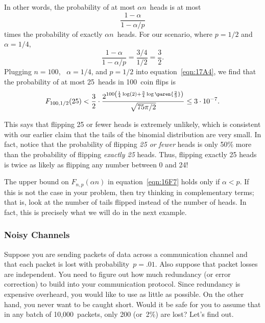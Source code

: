 \begin{editingnotes}
In other words, the probability of at most $\alpha n$~heads is at most
\begin{equation*}
    \frac{1 - \alpha}{1 - \alpha/p}
\end{equation*}
times the probability of exactly $\alpha n$~heads. For our scenario,
where $p = 1/2$ and $\alpha = 1/4$,
\begin{equation*}
\frac{1 - \alpha}{1 - \alpha/p}
    = \frac{3/4}{1/2} %
    = \frac{3}{2}.
\end{equation*}
Plugging $n = 100$, \ $\alpha = 1/4$, and $p = 1/2$ into
equation~\eqref{eqn:17A4}, we find that the probability of at most
25~heads in 100~coin flips is
\begin{equation*}
F_{100, 1/2}(25)
    < \frac{3}{2} \cdot
        \frac{  \displaystyle
                2^{100 \left( \frac{1}{4} \log(2)
                     + \frac{3}{4} \log\paren{\frac{2}{3}} \right) }
             }
             { \sqrt{75 \pi /2} } %
    \le 3 \cdot 10^{-7}.
\end{equation*}

This says that flipping 25 or fewer heads is extremely unlikely, which
is consistent with our earlier claim that the tails of the binomial
distribution are very small.  In fact, notice that the probability of
flipping \emph{25 or fewer} heads is only 50\% more than the
probability of flipping \emph{exactly 25} heads.  Thus, flipping
exactly 25 heads is twice as likely as flipping any number between 0
and 24!

\begin{caveat}
The upper bound on $F_{n, p}(\alpha n)$ in equation~\eqref{eqn:16F7}
holds only if $\alpha < p$.  If this is not the case in your problem,
then try thinking in complementary terms; that is, look at the number
of tails flipped instead of the number of heads.  In fact, this is
precisely what we will do in the next example.
\end{caveat}

\subsubsection{Noisy Channels}

Suppose you are sending packets of data across a communication channel
and that each packet is lost with probability~$p = .01$.  Also suppose
that packet losses are independent.  You need to figure out how much
redundancy (or error correction) to build into your communication
protocol.  Since redundancy is expensive overheard, you would like to
use as little as possible.  On the other hand, you never want to be
caught short.  Would it be safe for you to assume that in any batch
of 10,000~packets, only 200 (or~2\%) are lost?  Let's find out.


\end{editingnotes}
